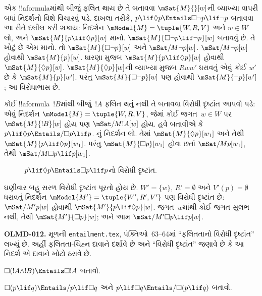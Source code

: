 \documentclass[../../../include/open-logic-section]{subfiles}
\begin{document}
\begin{ex}
  એક !!a{formula}માંથી બીજું ફલિત થાય છે તે બતાવવા
  $\mSat{M}{}[w]$ની વ્યાખ્યા વાપરી બધાં નિદર્શનો
  વિશે વિચારવું પડે. દાખલા તરીકે,
  $p \lif \Diamond p \Entails \Box\lnot p \lif \lnot p$
  બતાવવા આ રીતે દલીલ કરી શકાય: નિદર્શન
  $\mModel{M} = \tuple{W, R,
    V}$ અને $w \in W$ લો, અને $\mSat{M}{p \lif \Diamond
    p}[w]$ માનો. $\mSat{M}{\Box\lnot p \lif \lnot
    p}[w]$ બતાવવું છે. તે ખોટું છે એમ માનો. તો
  $\mSat{M}{\Box\lnot p}[w]$ અને
  $\mSat/{M}{\lnot p}[w]$. $\mSat/{M}{\lnot p}[w]$
  હોવાથી $\mSat{M}{p}[w]$. ધારણા મુજબ
  $\mSat{M}{p \lif \Diamond p}[w]$ હોવાથી
  $\mSat{M}{\Diamond p}[w]$. $\mSat{M}{\Diamond
    p}[w]$ની વ્યાખ્યા મુજબ $Rww'$ ધરાવતું એવું કોઈ
  $w'$ છે કે $\mSat{M}{p}[w']$. પરંતુ
  $\mSat{M}{\Box \lnot p}[w]$ પણ હોવાથી
  $\mSat{M}{\lnot p}[w']$; આ વિરોધાભાસ છે.

  કોઈ !!a{formula}~$!B$માંથી બીજું~$!A$ ફલિત થતું
  નથી તે બતાવવા વિરોધી દૃષ્ટાંત આપવો પડે: એવું
  નિદર્શન $\mModel{M} = \tuple{W, R,
    V}$, જેમાં કોઈ જગત~$w \in W$ પર $\mSat{M}{!B}[w]$
  હોય પણ $\mSat/{M}{!A}[w]$ હોય. હવે બતાવીએ કે
  $p \lif \Diamond p \Entails/
  \Box p \lif p$. નું નિદર્શન લો.
  તેમાં $\mSat{M}{\Diamond p}[w_1]$ અને તેથી
  $\mSat{M}{p \lif
    \Diamond p}[w_1]$. પરંતુ $\mSat{M}{\Box p}[w_1]$
  હોવા છતાં $\mSat/{M}{p}[w_1]$, તેથી
  $\mSat/{M}{\Box p \lif p}[w_1]$.
  \begin{figure}
  \begin{center}
  \end{center}
  \caption{$p \lif \Diamond p \Entails \Box p \lif p$નો વિરોધી દૃષ્ટાંત.}
  \end{figure}

  ઘણીવાર બહુ સરળ વિરોધી દૃષ્ટાંત પૂરતો હોય છે.
  $W' = \{w\}$, $R' = \emptyset$ અને $V'(p) =
  \emptyset$ ધરાવતું નિદર્શન $\mModel{M'} =
  \tuple{W', R', V'}$ પણ વિરોધી દૃષ્ટાંત છે:
  $\mSat/{M'}{p}[w]$ હોવાથી
  $\mSat{M'}{p \lif \Diamond p}[w]$. જગત~$w$માંથી
  કોઈ જગત સુલભ નથી, તેથી $\mSat{M'}{\Box p}[w]$;
  અને આમ $\mSat/{M'}{\Box p
    \lif p}[w]$.
\end{ex}
\begin{editorial}
\textbf{OLMD-012.} મૂળની \texttt{entailment.tex}, પંક્તિઓ~63--64માં “ફલિતતાનો વિરોધી દૃષ્ટાંત” લખ્યું છે. અહીં ફલિતતા-ચિહ્ન દાવાને દર્શાવે છે અને “વિરોધી દૃષ્ટાંત” જણાવે છે કે આ નિદર્શ એ દાવાને ખોટો ઠરાવે છે.
\end{editorial}

\begin{prob}
  $\Box (!A \land !B) \Entails \Box !A$ બતાવો.
\end{prob}

\begin{prob}
  $\Box (p \lif q) \Entails/ p \lif \Box q$ અને $p \lif \Box
  q \Entails/\Box (p \lif q)$ બતાવો.
\end{prob}
\end{document}
